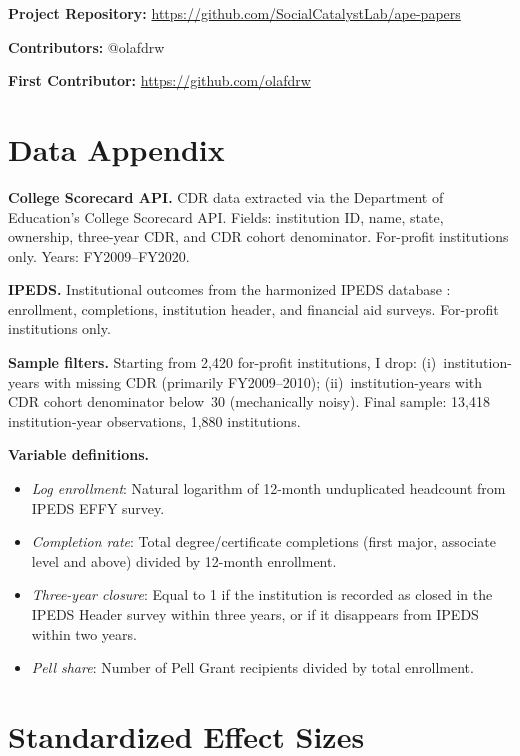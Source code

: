 \documentclass[12pt]{article}
\begin{document}
\noindent\textbf{Project Repository:} \url{https://github.com/SocialCatalystLab/ape-papers}

\noindent\textbf{Contributors:} @olafdrw

\noindent\textbf{First Contributor:} \url{https://github.com/olafdrw}

\label{apep_main_text_end}
\newpage


\newpage
\appendix

\section{Data Appendix}

\textbf{College Scorecard API.} CDR data extracted via the Department of Education's College Scorecard API. Fields: institution ID, name, state, ownership, three-year CDR, and CDR cohort denominator. For-profit institutions only. Years: FY2009--FY2020.

\textbf{IPEDS.} Institutional outcomes from the harmonized IPEDS database \citep{goldsmith2024ipeds}: enrollment, completions, institution header, and financial aid surveys. For-profit institutions only.

\textbf{Sample filters.} Starting from 2,420 for-profit institutions, I drop: (i)~institution-years with missing CDR (primarily FY2009--2010); (ii)~institution-years with CDR cohort denominator below~30 (mechanically noisy). Final sample: 13,418 institution-year observations, 1,880 institutions.

\textbf{Variable definitions.}
\begin{itemize}
\item \textit{Log enrollment}: Natural logarithm of 12-month unduplicated headcount from IPEDS EFFY survey.
\item \textit{Completion rate}: Total degree/certificate completions (first major, associate level and above) divided by 12-month enrollment.
\item \textit{Three-year closure}: Equal to 1 if the institution is recorded as closed in the IPEDS Header survey within three years, or if it disappears from IPEDS within two years.
\item \textit{Pell share}: Number of Pell Grant recipients divided by total enrollment.
\end{itemize}

\section{Standardized Effect Sizes}
\label{sec:sde}


\end{document}
